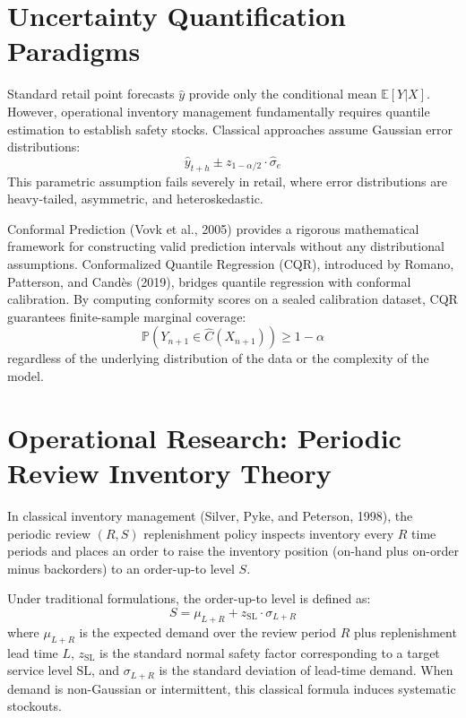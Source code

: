 \documentclass[12pt,a4paper,oneside]{report}
\theoremstyle{definition}
\begin{document}
\section{Uncertainty Quantification Paradigms}
Standard retail point forecasts $\hat{y}$ provide only the conditional mean $\mathbb{E}[Y|X]$. However, operational inventory management fundamentally requires quantile estimation to establish safety stocks. Classical approaches assume Gaussian error distributions:
\begin{equation}
\hat{y}_{t+h} \pm z_{1-\alpha/2} \cdot \hat{\sigma}_e
\end{equation}
This parametric assumption fails severely in retail, where error distributions are heavy-tailed, asymmetric, and heteroskedastic. 

Conformal Prediction (Vovk et al., 2005) provides a rigorous mathematical framework for constructing valid prediction intervals without any distributional assumptions. Conformalized Quantile Regression (CQR), introduced by Romano, Patterson, and Candès (2019), bridges quantile regression with conformal calibration. By computing conformity scores on a sealed calibration dataset, CQR guarantees finite-sample marginal coverage:
\begin{equation}
\mathbb{P}\left(Y_{n+1} \in \hat{C}(X_{n+1})\right) \ge 1 - \alpha
\end{equation}
regardless of the underlying distribution of the data or the complexity of the model.

\section{Operational Research: Periodic Review Inventory Theory}
In classical inventory management (Silver, Pyke, and Peterson, 1998), the periodic review $(R, S)$ replenishment policy inspects inventory every $R$ time periods and places an order to raise the inventory position (on-hand plus on-order minus backorders) to an order-up-to level $S$.

Under traditional formulations, the order-up-to level is defined as:
\begin{equation}
S = \mu_{L+R} + z_{\text{SL}} \cdot \sigma_{L+R}
\end{equation}
where $\mu_{L+R}$ is the expected demand over the review period $R$ plus replenishment lead time $L$, $z_{\text{SL}}$ is the standard normal safety factor corresponding to a target service level $\text{SL}$, and $\sigma_{L+R}$ is the standard deviation of lead-time demand. When demand is non-Gaussian or intermittent, this classical formula induces systematic stockouts.
\end{document}
